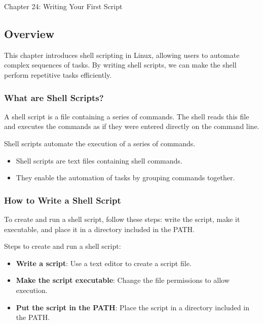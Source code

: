 \begin{notes}{Chapter 24: Writing Your First Script}
    \subsection*{Overview}

    This chapter introduces shell scripting in Linux, allowing users to automate complex sequences of tasks. By writing shell scripts, we can make the shell perform repetitive tasks efficiently.
    
    \subsubsection*{What are Shell Scripts?}
    
    A shell script is a file containing a series of commands. The shell reads this file and executes the commands as if they were entered directly on the command line.
    
    \begin{highlight}
    
    Shell scripts automate the execution of a series of commands.
    
    \begin{itemize}
        \item Shell scripts are text files containing shell commands.
        \item They enable the automation of tasks by grouping commands together.
    \end{itemize}
    
    \end{highlight}
    
    \subsubsection*{How to Write a Shell Script}
    
    To create and run a shell script, follow these steps: write the script, make it executable, and place it in a directory included in the PATH.
    
    \begin{highlight}
    
    Steps to create and run a shell script:
    
    \begin{itemize}
        \item \textbf{Write a script}: Use a text editor to create a script file.
        \item \textbf{Make the script executable}: Change the file permissions to allow execution.
        \item \textbf{Put the script in the PATH}: Place the script in a directory included in the PATH.
    \end{itemize}
    

\end{highlight}
\end{notes}

